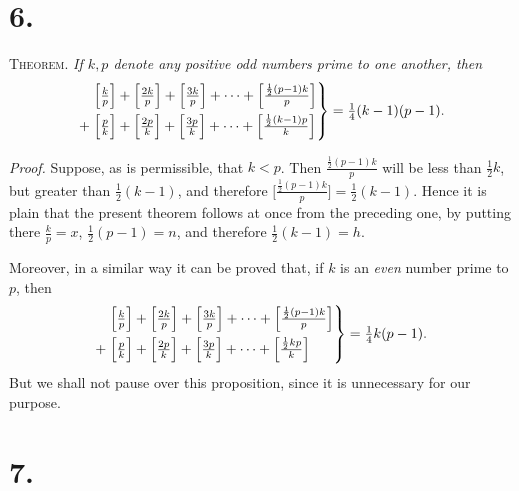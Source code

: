 \documentclass[11pt]{article}
\begin{document}
\section*{6.}

\textsc{Theorem.} \emph{If $k,p$ denote any positive odd numbers prime to one
another, then}
\[
  \left.
  \begin{aligned}
  &\Bigl[\tfrac{k}{p}\Bigr]+\Bigl[\tfrac{2k}{p}\Bigr]+\Bigl[\tfrac{3k}{p}\Bigr]
        +\dots+\Bigl[\tfrac{\frac{1}{2}(p-1)k}{p}\Bigr]\\
  +\;&\Bigl[\tfrac{p}{k}\Bigr]+\Bigl[\tfrac{2p}{k}\Bigr]+\Bigl[\tfrac{3p}{k}\Bigr]
        +\dots+\Bigl[\tfrac{\frac{1}{2}(k-1)p}{k}\Bigr]
  \end{aligned}
  \right\}=\tfrac{1}{4}(k-1)(p-1).
\]

\medskip
\emph{Proof.} Suppose, as is permissible, that $k<p$. Then
$\tfrac{\frac{1}{2}(p-1)k}{p}$ will be less than $\tfrac{1}{2}k$, but greater
than $\tfrac{1}{2}(k-1)$, and therefore
$\bigl[\tfrac{\frac{1}{2}(p-1)k}{p}\bigr]=\tfrac{1}{2}(k-1)$. Hence it is plain
that the present theorem follows at once from the preceding one, by putting
there $\tfrac{k}{p}=x$, $\tfrac{1}{2}(p-1)=n$, and therefore
$\tfrac{1}{2}(k-1)=h$.

\medskip
Moreover, in a similar way it can be proved that, if $k$ is an \emph{even}
number prime to $p$, then
\[
  \left.
  \begin{aligned}
  &\Bigl[\tfrac{k}{p}\Bigr]+\Bigl[\tfrac{2k}{p}\Bigr]+\Bigl[\tfrac{3k}{p}\Bigr]
        +\dots+\Bigl[\tfrac{\frac{1}{2}(p-1)k}{p}\Bigr]\\
  +\;&\Bigl[\tfrac{p}{k}\Bigr]+\Bigl[\tfrac{2p}{k}\Bigr]+\Bigl[\tfrac{3p}{k}\Bigr]
        +\dots+\Bigl[\tfrac{\frac{1}{2}kp}{k}\Bigr]
  \end{aligned}
  \right\}=\tfrac{1}{4}k(p-1).
\]
But we shall not pause over this proposition, since it is unnecessary for our purpose.

\section*{7.}
\end{document}
